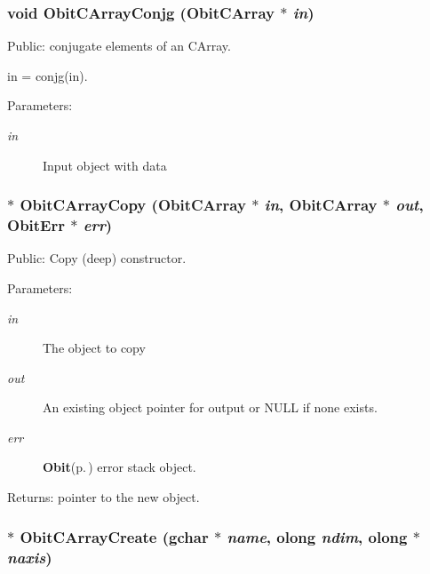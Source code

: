 \subsubsection{\setlength{\rightskip}{0pt plus 5cm}void Obit\-CArray\-Conjg ({\bf Obit\-CArray} $\ast$ {\em in})}\label{ObitCArray_8h_a46}


Public: conjugate elements of an CArray. 

in = conjg(in). \begin{Desc}
\item[Parameters:]
\begin{description}
\item[{\em in}]Input object with data \end{description}
\end{Desc}
\subsubsection{$\ast$ Obit\-CArray\-Copy ({\bf Obit\-CArray} $\ast$ {\em in}, {\bf Obit\-CArray} $\ast$ {\em out}, {\bf Obit\-Err} $\ast$ {\em err})}\label{ObitCArray_8h_a39}


Public: Copy (deep) constructor. 

\begin{Desc}
\item[Parameters:]
\begin{description}
\item[{\em in}]The object to copy \item[{\em out}]An existing object pointer for output or NULL if none exists. \item[{\em err}]{\bf Obit}{\rm (p.\,\pageref{structObit})} error stack object. \end{description}
\end{Desc}
\begin{Desc}
\item[Returns:]pointer to the new object. \end{Desc}
\subsubsection{$\ast$ Obit\-CArray\-Create (gchar $\ast$ {\em name}, {\bf olong} {\em ndim}, {\bf olong} $\ast$ {\em naxis})}\label{ObitCArray_8h_a37}


